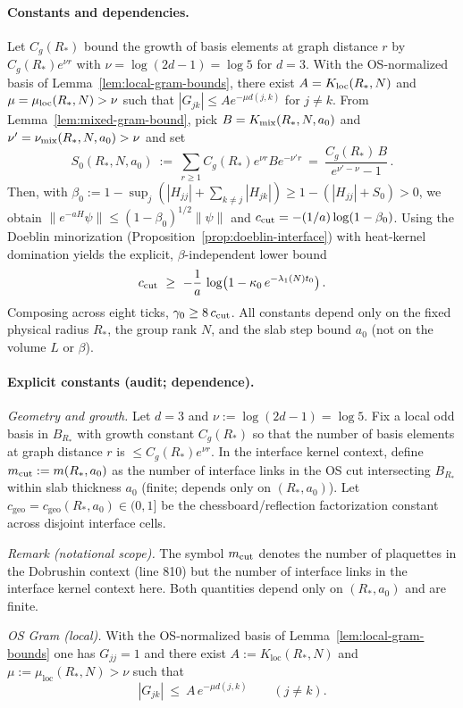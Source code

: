 \documentclass[11pt]{amsart}
\theoremstyle{plain}
\theoremstyle{definition}
\theoremstyle{remark}
\begin{document}
\paragraph{Constants and dependencies.}
Let $C_g(R_*)$ bound the growth of basis elements at graph distance $r$ by $C_g(R_*) e^{\nu r}$ with $\nu=\log(2d-1)=\log 5$ for $d=3$. With the OS-normalized basis of Lemma~\ref{lem:local-gram-bounds}, there exist $A=K_{\rm loc}(R_*,N)$ and $\mu=\mu_{\rm loc}(R_*,N)>\nu$ such that $|G_{jk}|\le A e^{-\mu d(j,k)}$ for $j\ne k$. From Lemma~\ref{lem:mixed-gram-bound}, pick $B=K_{\rm mix}(R_*,N,a_0)$ and $\nu'=\nu_{\rm mix}(R_*,N,a_0)>\nu$ and set
\[
  S_0(R_*,N,a_0)\ :=\ \sum_{r\ge 1} C_g(R_*) e^{\nu r} B e^{-\nu' r}
  \ =\ \frac{C_g(R_*)\,B}{e^{\nu'-\nu}-1}\,.
\]
Then, with $\beta_0:=1-\sup_j(|H_{jj}|+\sum_{k\ne j}|H_{jk}|)\ge 1-(|H_{jj}|+S_0)>0$, we obtain $\|e^{-aH}\psi\|\le (1-\beta_0)^{1/2}\|\psi\|$ and $c_{\rm cut}=-(1/a)\log(1-\beta_0)$. Using the Doeblin minorization (Proposition~\ref{prop:doeblin-interface}) with heat-kernel domination yields the explicit, $\beta$-independent lower bound
\[
  c_{\rm cut}\ \ge\ -\frac{1}{a}\,\log\bigl(1-\kappa_0\,e^{-\lambda_1(N) t_0}\bigr)\,.
\]
Composing across eight ticks, $\gamma_0\ge 8\,c_{\rm cut}$. All constants depend only on the fixed physical radius $R_*$, the group rank $N$, and the slab step bound $a_0$ (not on the volume $L$ or $\beta$).
\paragraph{Explicit constants (audit; dependence).}
\emph{Geometry and growth.} Let $d=3$ and $\nu:=\log(2d-1)=\log 5$. Fix a local odd basis in $B_{R_*}$ with growth constant $C_g(R_*)$ so that the number of basis elements at graph distance $r$ is $\le C_g(R_*) e^{\nu r}$. In the interface kernel context, define $m_{\rm cut}:=m(R_*,a_0)$ as the number of interface links in the OS cut intersecting $B_{R_*}$ within slab thickness $a_0$ (finite; depends only on $(R_*,a_0)$). Let $c_{\mathrm{geo}}=c_{\mathrm{geo}}(R_*,a_0)\in(0,1]$ be the chessboard/reflection factorization constant across disjoint interface cells.

\emph{Remark (notational scope).} The symbol $m_{\rm cut}$ denotes the number of plaquettes in the Dobrushin context (line 810) but the number of interface links in the interface kernel context here. Both quantities depend only on $(R_*,a_0)$ and are finite.

\emph{OS Gram (local).} With the OS-normalized basis of Lemma~\ref{lem:local-gram-bounds} one has $G_{jj}=1$ and there exist $A:=K_{\mathrm{loc}}(R_*,N)$ and $\mu:=\mu_{\mathrm{loc}}(R_*,N)>\nu$ such that
\[
  |G_{jk}|\ \le\ A\,e^{-\mu d(j,k)}\qquad (j\ne k).
\]
\end{document}
